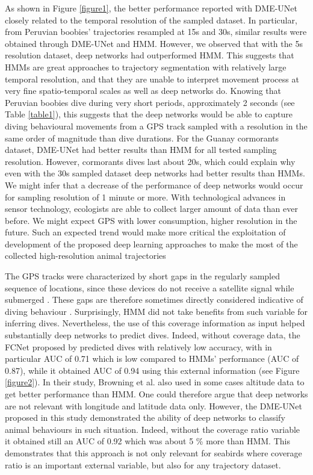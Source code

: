 \documentclass{article}
\begin{document}
As shown in Figure \ref{figure1}, the better performance reported with DME-UNet closely related to the temporal resolution of the sampled dataset.
In particular, from Peruvian boobies' trajectories resampled at 15s and 30s, similar results were obtained through DME-UNet and HMM. However, we observed that with the 5s resolution dataset, deep networks had outperformed HMM. This suggests that HMMs are great approaches to trajectory segmentation with relatively large temporal resolution, and that they are unable to interpret movement process at very fine spatio-temporal scales as well as deep networks do. Knowing that Peruvian boobies dive during very short periods, approximately 2 seconds (see Table \ref{table1}), this suggests that the deep networks would be able to capture diving behavioural movements from a GPS track sampled with a resolution in the same order of magnitude than dive durations.
For the Guanay cormorants dataset, DME-UNet had better results than HMM for all tested sampling resolution. However, cormorants dives last about 20s, which could explain why even with the 30s sampled dataset deep networks had better results than HMMs. We might infer that a decrease of the performance of deep networks would occur for sampling resolution of 1 minute or more.
With technological advances in sensor technology, ecologists are able to collect larger amount of data than ever before. We might expect GPS with lower consumption, higher resolution in the future. Such an expected trend would make more critical the exploitation of development of the proposed deep learning approaches to make the most of the collected high-resolution  animal trajectories   \cite{beyan_setting_2020,malde_machine_2020, yoda_advances_2019}

The GPS tracks were characterized by short gaps in the regularly sampled sequence of locations, since these devices do not receive a satellite signal while submerged \cite{boyd_movement_2014,wilson_technological_2012}.
These gaps are therefore sometimes directly considered indicative of diving behaviour \cite{weimerskirch_foraging_2012}.
Surprisingly, HMM did not take benefits from such variable for inferring dives.
Nevertheless, the use of this coverage information as input helped substantially deep networks to predict dives.
Indeed, without coverage data, the FCNet proposed by \cite{browning_predicting_2018} predicted dives with relatively low accuracy, with in particular AUC of 0.71 which is low  compared to HMMs' performance (AUC of 0.87), while it obtained AUC of 0.94 using this external information (see Figure \ref{figure2}). In their study, Browning et al. also used in some cases altitude data to get better performance than HMM. One could therefore argue that deep networks are not relevant with longitude and latitude data only.
However, the DME-UNet proposed in this study demonstrated the ability of deep networks to classify animal behaviours in such situation. Indeed, without the coverage ratio variable it obtained still an AUC of 0.92 which was about 5 \% more than HMM. This demonstrates that this approach is not only relevant for seabirds where coverage ratio is an important external variable, but also for any trajectory dataset.
\end{document}
